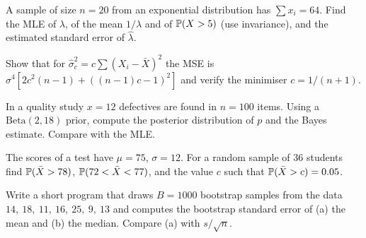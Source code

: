 \begin{exercise}
A sample of size $n=20$ from an exponential distribution has $\sum x_i=64$. Find the MLE of $\lambda$, of the mean $1/\lambda$ and of $\mathbb{P}(X>5)$ (use invariance), and the estimated standard error of $\hat\lambda$.
\end{exercise}

\begin{exercise}
Show that for $\hat\sigma^2_c=c\sum(X_i-\bar{X})^2$ the MSE is $\sigma^4[2c^2(n-1)+((n-1)c-1)^2]$ and verify the minimiser $c=1/(n+1)$.
\end{exercise}

\begin{exercise}
In a quality study $x=12$ defectives are found in $n=100$ items. Using a $\mathrm{Beta}(2,18)$ prior, compute the posterior distribution of $p$ and the Bayes estimate. Compare with the MLE.
\end{exercise}

\begin{exercise}
The scores of a test have $\mu=75$, $\sigma=12$. For a random sample of $36$ students find $\mathbb{P}(\bar{X}>78)$, $\mathbb{P}(72<\bar{X}<77)$, and the value $c$ such that $\mathbb{P}(\bar{X}>c)=0.05$.
\end{exercise}

\begin{exercise}
Write a short program that draws $B=1000$ bootstrap samples from the data $14,\ 18,\ 11,\ 16,\ 25,\ 9,\ 13$ and computes the bootstrap standard error of (a) the mean and (b) the median. Compare (a) with $s/\sqrt n$.
\end{exercise}

